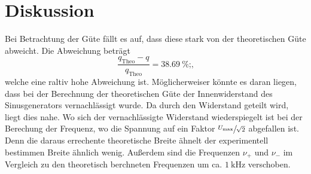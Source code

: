 \section{Diskussion}
\label{sec:Diskussion}
Bei Betrachtung der Güte fällt es auf, dass diese stark von der theoretischen  Güte abweicht.
Die Abweichung beträgt
\begin{equation}
    \frac{ q_\text{Theo} - q}{q_\text{Theo}} = \SI{38.69}{\percent} \text{;} \text{,}
\end{equation}
welche eine raltiv hohe Abweichung ist. Möglicherweiser könnte es daran liegen, dass bei der Berechnung der theoretischen Güte der Innenwiderstand des
Sinusgenerators vernachlässigt wurde. Da durch den Widerstand geteilt wird, liegt dies nahe.
Wo sich der vernachlässigte Widerstand wiederspiegelt ist bei der Berechung der Frequenz, wo die Spannung auf ein Faktor 
$\sfrac{U_\text{max}}{\sqrt{2}}$ abgefallen ist. Denn die daraus errechente theoretische Breite ähnelt der experimentell bestimmen Breite ähnlich wenig.
Außerdem sind die Frequenzen $\nu_+$ und $\nu_-$ im Vergleich zu den theoretisch berchneten Frequenzen um ca. $\SI{1}{\kilo\hertz}$ verschoben.
